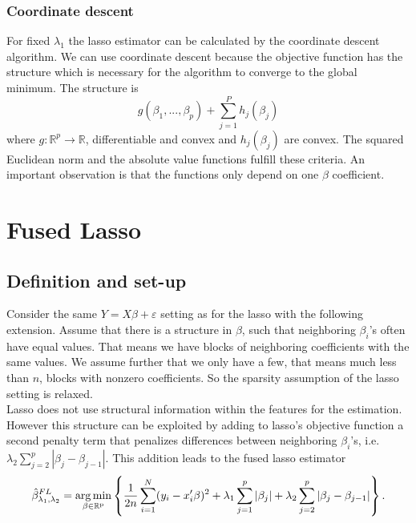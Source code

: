 \documentclass{article}
\theoremstyle{definition}
\DeclareMathOperator*{\argmin}{arg\,min}
\begin{document}
%
%
\subsubsection{Coordinate descent} \label{Sec: Coordinate Lasso}
For fixed $\lambda_1$ the lasso estimator can be calculated by the coordinate descent algorithm. We can use coordinate descent because the objective function has the structure which is necessary for the algorithm to converge to the global minimum. The structure is
\begin{equation}
g(\beta_1,...,\beta_p)+\sum_{j=1}^Ph_j(\beta_j) \nonumber
\end{equation}
where $g: \mathbb{R}^p \to \mathbb{R}$, differentiable and convex and $h_j(\beta_j)$ are convex. The squared Euclidean norm and the absolute value functions fulfill these criteria. An important observation is that the functions only depend on one $\beta$ coefficient.
\cite[chapter 5]{sparsity}

\section{Fused Lasso}
\subsection{Definition and set-up}

Consider the same $Y=X\beta+\varepsilon$ setting as for the lasso with the following extension. Assume that there is a structure in $\beta$, such that neighboring $\beta_i$'s often have equal values. That means we have blocks of neighboring coefficients with the same values. We assume further that we only have a few, that means much less than $n$, blocks with nonzero coefficients. So the sparsity assumption of the lasso setting is relaxed.\\
Lasso does not use structural information within the features for the estimation. However this structure can be exploited by adding to lasso's objective function a second penalty term that penalizes differences between neighboring $\beta_i$'s, i.e. $\lambda_2\sum_{j=2}^p|\beta_j- \beta_{j-1}|$. This addition leads to the fused lasso estimator 
	\begin{equation}
		\hat{\beta}_{\lambda_1,\lambda_2}^{FL}=\argmin_{\beta \in\rm \mathbb{R}^p} \left\{ \frac{1}{2n}  \sum_{i=1}^{N}(y_{i}-x_{i}'\beta)^2+\lambda_1 \sum_{j=1}^p|\beta_j|+ \lambda_2 \sum_{j=2}^p|\beta_j- \beta_{j-1}| \right \}.
	\end{equation}
	
\end{document}
